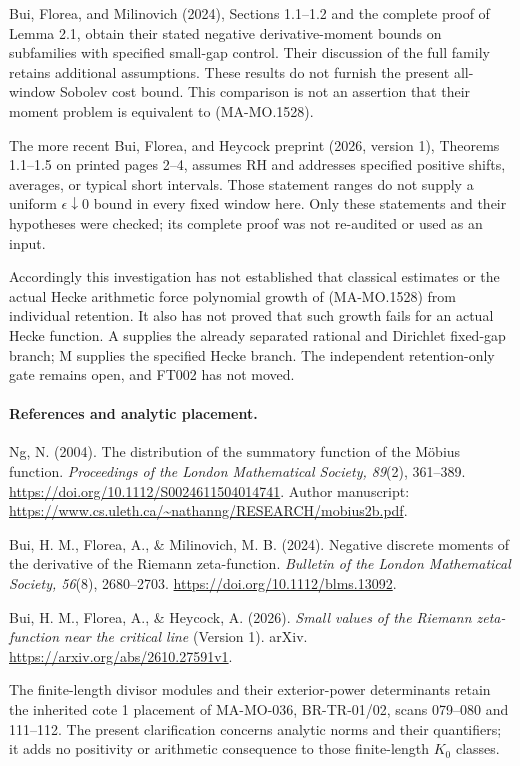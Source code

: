 Bui, Florea, and Milinovich (2024), Sections 1.1--1.2 and
the complete proof of Lemma 2.1, obtain their stated
negative derivative-moment bounds on subfamilies with
specified small-gap control.  Their discussion of the
full family retains additional assumptions.  These results
do not furnish the present all-window Sobolev cost bound.
This comparison is not an assertion that their moment
problem is equivalent to (MA-MO.1528).

The more recent Bui, Florea, and Heycock preprint
(2026, version 1), Theorems 1.1--1.5 on printed pages 2--4,
assumes RH and addresses specified positive shifts,
averages, or typical short intervals.  Those statement
ranges do not supply a uniform $\epsilon\downarrow0$
bound in every fixed window here.  Only these statements
and their hypotheses were checked; its complete proof
was not re-audited or used as an input.

Accordingly this investigation has not established that
classical estimates or the actual Hecke arithmetic force
polynomial growth of (MA-MO.1528) from individual retention.
It also has not proved that such growth fails for an actual
Hecke function.  A supplies the already separated rational
and Dirichlet fixed-gap branch; M supplies the specified
Hecke branch.  The independent retention-only gate remains
open, and FT002 has not moved.

\paragraph{References and analytic placement.}
Ng, N. (2004). The distribution of the summatory function
of the Möbius function. \emph{Proceedings of the London
Mathematical Society, 89}(2), 361--389.
\url{https://doi.org/10.1112/S0024611504014741}.
Author manuscript:
\url{https://www.cs.uleth.ca/~nathanng/RESEARCH/mobius2b.pdf}.

Bui, H. M., Florea, A., \& Milinovich, M. B. (2024).
Negative discrete moments of the derivative of the
Riemann zeta-function. \emph{Bulletin of the London
Mathematical Society, 56}(8), 2680--2703.
\url{https://doi.org/10.1112/blms.13092}.

Bui, H. M., Florea, A., \& Heycock, A. (2026).
\emph{Small values of the Riemann zeta-function near the
critical line} (Version 1). arXiv.
\url{https://arxiv.org/abs/2610.27591v1}.

The finite-length divisor modules and their exterior-power
determinants retain the inherited cote 1 placement of
MA-MO-036, BR-TR-01/02, scans 079--080 and 111--112.
The present clarification concerns analytic norms and
their quantifiers; it adds no positivity or arithmetic
consequence to those finite-length $K_0$ classes.
